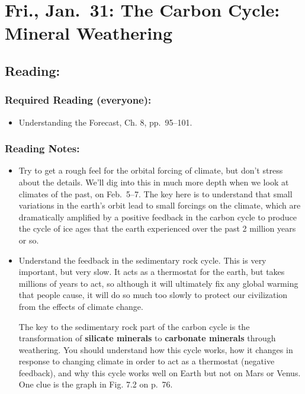 \documentclass[
]{article}
\providecommand{\tightlist}{%
  \setlength{\itemsep}{0pt}\setlength{\parskip}{0pt}}
\begin{document}
\hypertarget{fri.-jan.-31-the-carbon-cycle-mineral-weathering}{%
\section{Fri., Jan.~31: The Carbon Cycle: Mineral
Weathering}\label{fri.-jan.-31-the-carbon-cycle-mineral-weathering}}

\hypertarget{reading-10}{%
\subsection{Reading:}\label{reading-10}}

\hypertarget{required-reading-everyone-8}{%
\subsubsection{Required Reading
(everyone):}\label{required-reading-everyone-8}}

\begin{itemize}
\tightlist
\item
  Understanding the Forecast, Ch. 8, pp.~95--101.
\end{itemize}

\hypertarget{reading-notes-8}{%
\subsubsection{Reading Notes:}\label{reading-notes-8}}

\begin{itemize}
\item
  Try to get a rough feel for the orbital forcing of climate, but don't
  stress about the details. We'll dig into this in much more depth when
  we look at climates of the past, on Feb.~5--7. The key here is to
  understand that small variations in the earth's orbit lead to small
  forcings on the climate, which are dramatically amplified by a
  positive feedback in the carbon cycle to produce the cycle of ice ages
  that the earth experienced over the past 2 million years or so.
\item
  Understand the feedback in the sedimentary rock cycle. This is very
  important, but very slow. It acts as a thermostat for the earth, but
  takes millions of years to act, so although it will ultimately fix any
  global warming that people cause, it will do so much too slowly to
  protect our civilization from the effects of climate change.

  The key to the sedimentary rock part of the carbon cycle is the
  transformation of \textbf{silicate minerals} to \textbf{carbonate
  minerals} through weathering. You should understand how this cycle
  works, how it changes in response to changing climate in order to act
  as a thermostat (negative feedback), and why this cycle works well on
  Earth but not on Mars or Venus. One clue is the graph in Fig. 7.2 on
  p.~76.
\end{itemize}
\end{document}
